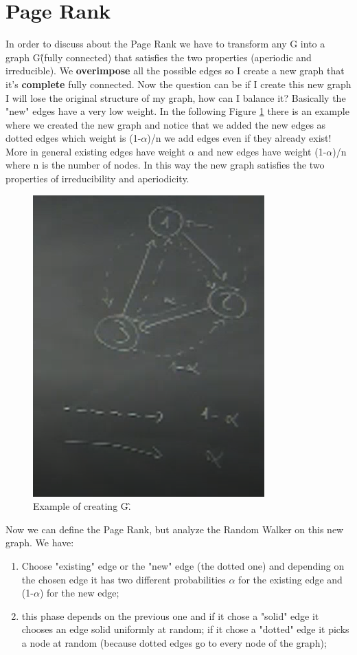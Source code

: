 \section{Page Rank}
In order to discuss about the Page Rank we have to transform any G into a graph G\^ (fully connected) that satisfies the two properties (aperiodic and irreducible).\newline
We \textbf{overimpose} all the possible edges so I create a new graph that it's \textbf{complete} fully connected. Now the question can be if I create this new graph I will lose the original structure of my graph, how can I balance it? Basically the "new" edges have a very low weight. In the following Figure \ref{fig:completegraph2} there is an example where we created the new graph and notice that we added the new edges as dotted edges which weight is (1-$\alpha$)/n we add edges even if they already exist! More in general existing edges have weight $\alpha$ and new edges have weight (1-$\alpha$)/n where n is the number of nodes. In this way the new graph satisfies the two properties of irreducibility and aperiodicity.\newline
\begin{figure}
    \centering
    \includegraphics[width=0.40\linewidth]{images/completegraph2.png}
    \caption{Example of creating G\^.}
    \label{fig:completegraph2}
\end{figure}
Now we can define the Page Rank, but analyze the Random Walker on this new graph. We have:
\begin{enumerate}
    \item Choose "existing" edge or the "new" edge (the dotted one) and depending on the chosen edge it has two different probabilities $\alpha$ for the existing edge and (1-$\alpha$) for the new edge;
    \item this phase depends on the previous one and if it chose a "solid" edge it chooses an edge solid uniformly at random; if it chose a "dotted" edge it picks a node at random (because dotted edges go to every node of the graph);
\end{enumerate}
